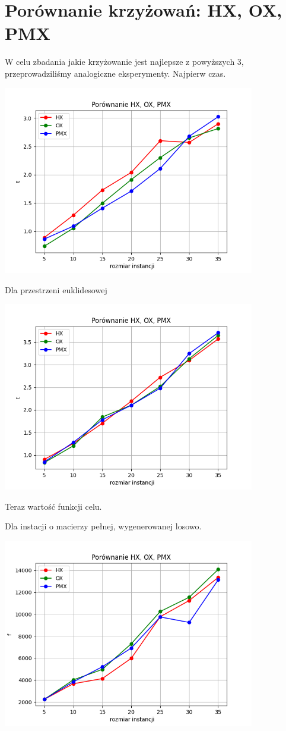 \documentclass{article}
\begin{document}
    \section{Porównanie krzyżowań: HX, OX, PMX}

     W celu zbadania jakie krzyżowanie jest najlepsze z
    powyższych 3, przeprowadziliśmy analogiczne eksperymenty.
    Najpierw czas.

     \includegraphics[width=11cm]{./spr3img/Figure_4.png}

    Dla przestrzeni euklidesowej

    \includegraphics[width=11cm]{./spr3img/Figure_4EUC.png}

    Teraz wartość funkcji celu.

    Dla instacji o macierzy pełnej, wygenerowanej losowo.

    \includegraphics[width=11cm]{./spr3img/Figure_3FULL.png}
\end{document}
